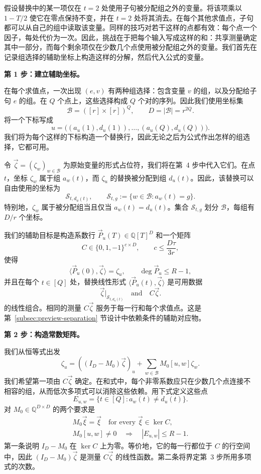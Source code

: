 \documentclass[11pt,reqno]{amsart}
\numberwithin{equation}{section}
\theoremstyle{definition}\newtheorem{definition}[theorem]{定义}
\theoremstyle{remark}\newtheorem{remark}[theorem]{注}
\renewcommand{\le}{\leqslant}
\begin{document}
假设替换中的某一项仅在 $t=2$ 处使用子句被分配组之外的变量。将该项乘以 $1-T/2$ 使它在零点保持不变，并在 $t=2$ 处将其消去。在每个其他求值点，子句都可以从自己的组中读取该变量。同样的技巧对若干这样的点都有效：每个点一个因子，每处代价为一次。因此，挑战在于把每个输入写成这样的和：共享测量确定其中一部分，而每个剩余项仅在少数几个点使用被分配组之外的变量。我们首先在记录组选择的辅助坐标上构造这样的分解，然后代入公式的变量。

\medskip\noindent
\textbf{第 1 步：建立辅助坐标。}\par\nobreak
\smallskip\noindent
在每个求值点，一次出现 $(e,v)$ 有两种组选择：包含变量 $v$ 的组，以及分配给子句 $e$ 的组。在 $Q$ 个点上，这些选择构成 $Q$ 个对的序列。因此我们使用坐标集
\[
 \mathcal B=([r]\times[r])^Q,\qquad D=|\mathcal B|=r^{2Q}.
\]
将一个下标写成
\[
 u=\bigl((a_u(1),d_u(1)),\ldots,(a_u(Q),d_u(Q))\bigr).
\]
我们将为每个这样的下标构造一个替换行，因此无论之后为公式作出怎样的组选择，它都可用。

令 $\vec\zeta=(\zeta_w)_{w\in\mathcal B}$ 为原始变量的形式占位符，我们将在第~4 步中代入它们。在点 $t$，坐标 $\zeta_w$ 属于组 $a_w(t)$，而 $\zeta_u$ 的替换被分配到组 $d_u(t)$。因此，该替换可以自由使用的坐标为
\[
 \mathcal S_{t,d_u(t)},\qquad
 \mathcal S_{t,g}:=\{w\in\mathcal B:a_w(t)=g\}.
\]
特别地，$\zeta_w$ 属于被分配组当且仅当 $a_w(t)=d_u(t)$。集合 $\mathcal S_{t,g}$ 划分 $\mathcal B$，每组有 $D/r$ 个坐标。

我们的辅助目标是构造系数行 $\vec P_u(T)\in\mathbb Q[T]^D$ 和一个矩阵
\[
 C\in\{0,1,-1\}^{c\times D},\qquad c\le\frac{D\tau}{3r},
\]
使得
\[
 \langle\vec P_u(0),\vec\zeta\rangle=\zeta_u,
 \qquad \deg\vec P_u\le R-1,
\]
并且在每个 $t\in[Q]$ 处，替换线性形式 $\langle\vec P_u(t),\vec\zeta\rangle$ 是可用数据
\begin{equation}\label{eq:overview-auxiliary-requirement}
 \vec\zeta|_{\mathcal S_{t,d_u(t)}}\quad\text{and}\quad C\vec\zeta.
\end{equation}
的线性组合。相同的测量 $C\vec\zeta$ 服务于每一行和每个求值点。这是第~\ref{subsec:preview-separation} 节设计中依赖条件的辅助对应物。

\medskip\noindent
\textbf{第 2 步：构造常数矩阵。}\par\nobreak
\smallskip\noindent
我们从恒等式出发
\[
 \zeta_u=((I_D-M_0)\vec\zeta)_u+
                   \sum_{w\in\mathcal B}M_0[u,w]\zeta_w.
\]
我们希望第一项由 $C\vec\zeta$ 确定。在和式中，每个非零系数应只在少数几个点连接不相容的组，从而低次多项式可以消除这些依赖。用下式定义这些点
\[
 E_{u,w}=\{t\in[Q]:a_w(t)\ne d_u(t)\}.
\]
对 $M_0\in\mathbb Q^{D\times D}$ 的两个要求是
\begin{equation}\label{eq:outline-matrix-conditions}
 \begin{gathered}
 M_0\vec\xi=\vec\xi\quad\text{for every }\vec\xi\in\ker C,\\
 M_0[u,w]\ne0\quad\Longrightarrow\quad |E_{u,w}|\le R-1.
 \end{gathered}
\end{equation}
第一条说明 $I_D-M_0$ 在 $\ker C$ 上为零。等价地，它的每一行都位于 $C$ 的行空间中，因此 $(I_D-M_0)\vec\zeta$ 是测量 $C\vec\zeta$ 的线性函数。第二条将界定第~3 步所用多项式的次数。
\end{document}
